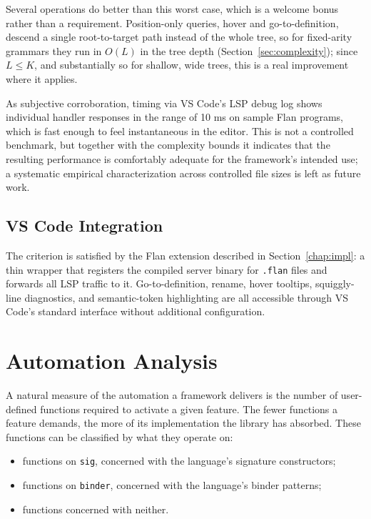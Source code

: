Several operations do better than this worst case, which is a welcome bonus rather than a requirement.
Position-only queries, hover and go-to-definition, descend a single root-to-target path instead of the whole tree, so for fixed-arity grammars they run in $O(L)$ in the tree depth (Section~\ref{sec:complexity}); since $L \leq K$, and substantially so for shallow, wide trees, this is a real improvement where it applies.

As subjective corroboration, timing via VS Code's LSP debug log shows individual handler responses in the range of 10 ms on sample Flan programs, which is fast enough to feel instantaneous in the editor.
This is not a controlled benchmark, but together with the complexity bounds it indicates that the resulting performance is comfortably adequate for the framework's intended use; a systematic empirical characterization across controlled file sizes is left as future work.

\subsection{VS Code Integration}

The criterion is satisfied by the Flan extension described in Section~\ref{chap:impl}: a thin wrapper that registers the compiled server binary for \texttt{.flan} files and forwards all LSP traffic to it.
Go-to-definition, rename, hover tooltips, squiggly-line diagnostics, and semantic-token highlighting are all accessible through VS Code's standard interface without additional configuration.

\section{Automation Analysis}
\label{sec:automation}

A natural measure of the automation a framework delivers is the number of user-defined functions required to activate a given feature.
The fewer functions a feature demands, the more of its implementation the library has absorbed.
These functions can be classified by what they operate on:

\begin{itemize}
  \item functions on \texttt{sig}, concerned with the language's signature constructors;
  \item functions on \texttt{binder}, concerned with the language's binder patterns;
  \item functions concerned with neither.
\end{itemize}

